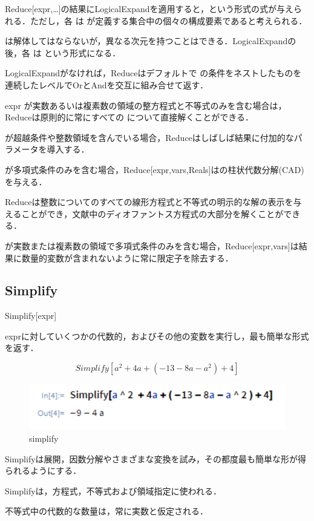 Reduce[expr,…]の結果にLogicalExpandを適用すると，という形式の式が与えられる．ただし，各 は が定義する集合中の個々の構成要素であると考えられる．

は解体してはならないが，異なる次元を持つことはできる．LogicalExpandの後，各 は という形式になる．

LogicalExpandがなければ，Reduceはデフォルトで の条件をネストしたものを連続したレベルでOrとAndを交互に組み合せて返す．

expr が実数あるいは複素数の領域の整方程式と不等式のみを含む場合は，Reduceは原則的に常にすべての について直接解くことができる．

が超越条件や整数領域を含んでいる場合，Reduceはしばしば結果に付加的なパラメータを導入する．

が多項式条件のみを含む場合，Reduce[expr,vars,Reals]はの柱状代数分解(CAD)を与える．

Reduceは整数についてのすべての線形方程式と不等式の明示的な解の表示を与えることができ，文献中のディオファントス方程式の大部分を解くことができる．

が実数または複素数の領域で多項式条件のみを含む場合，Reduce[expr,vars]は結果に数量的変数が含まれないように常に限定子を除去する．

\clearpage

\subsection {Simplify}

Simplify[expr]

exprに対していくつかの代数的，およびその他の変数を実行し，最も簡単な形式を返す．

\[Simplify[a^2 +4a+(-13-8a-a^2 )+4]\]

\begin{figure}[h]
\centering
\includegraphics[width=15cm]{simplify.png}
\caption{simplify}\label{図}
\end{figure}

Simplifyは展開，因数分解やさまざまな変換を試み，その都度最も簡単な形が得られるようにする．

Simplifyは，方程式，不等式および領域指定に使われる．

不等式中の代数的な数量は，常に実数と仮定される．

